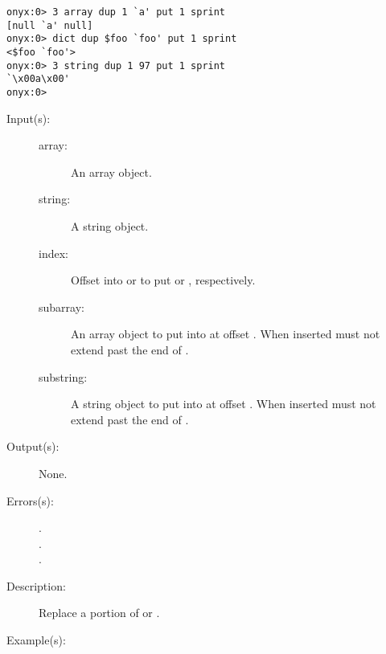 \begin{description}
\begin{description}
\begin{verbatim}
onyx:0> 3 array dup 1 `a' put 1 sprint
[null `a' null]
onyx:0> dict dup $foo `foo' put 1 sprint
<$foo `foo'>
onyx:0> 3 string dup 1 97 put 1 sprint
`\x00a\x00'
onyx:0>
		\end{verbatim}
	\end{description}
\label{systemdict:putinterval}
\item[{\onyxop{array index subarray}{putinterval}{--}}: ]
\item[{\onyxop{string index substring}{putinterval}{--}}: ]
	\begin{description}\item[]
	\item[Input(s): ]
		\begin{description}\item[]
		\item[array: ]
			An array object.
		\item[string: ]
			A string object.
		\item[index: ]
			Offset into  or  to put
			 or , respectively.
		\item[subarray: ]
			An array object to put into  at offset
			.  When inserted  must not
			extend past the end of .
		\item[substring: ]
			A string object to put into  at offset
			.  When inserted  must not
			extend past the end of .
		\end{description}
	\item[Output(s): ] None.
	\item[Errors(s): ]
		\begin{description}\item[]
		\item[.]
		\item[.]
		\item[.]
		\end{description}
	\item[Description: ]
		Replace a portion of  or .
	\item[Example(s): ]\begin{verbatim}


\end{verbatim}
\end{description}
\end{description}
